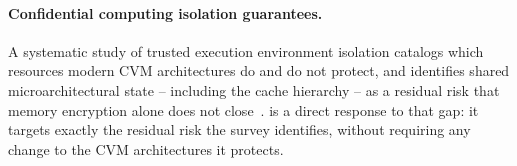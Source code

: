 \paragraph{Confidential computing isolation guarantees.} A systematic study of trusted
execution environment isolation catalogs which resources modern CVM architectures do and do
not protect, and identifies shared microarchitectural state -- including the cache hierarchy
-- as a residual risk that memory encryption alone does not close~\cite{ivanova2021tee}.
\sysname{} is a direct response to that gap: it targets exactly the residual risk the survey
identifies, without requiring any change to the CVM architectures it protects.
